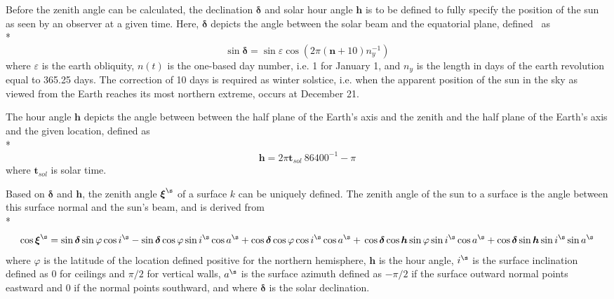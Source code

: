 Before the zenith angle can be calculated, the declination $\boldsymbol{\delta}$ and solar hour angle $\boldsymbol{h}$ is to be defined to fully specify the position of the sun as seen by an observer at a given time. Here, $\boldsymbol{\delta}$ depicts the angle between the solar beam and the equatorial plane, defined~\cite{Spencer1971} as \\*
\begin{equation}
\sin \boldsymbol{\delta} = \sin \varepsilon \cos \left(2\pi \left(\boldsymbol{n}+10\right) n_{y}^{-1} \right)
\end{equation}
where $\varepsilon$ is the earth obliquity, $n(t)$ is the one-based day number, i.e. 1 for January 1, and $n_{y}$ is the length in days of the earth revolution equal to 365.25 days. The correction of 10 days is required as winter solstice, i.e. when the apparent position of the sun in the sky as viewed from the Earth reaches its most northern extreme, occurs at December 21. 

The hour angle $\boldsymbol{h}$ depicts the angle between between the half plane of the Earth's axis and the zenith and the half plane of the Earth's axis and the given location, defined as  \\*
\begin{equation}
\boldsymbol{h} = 2\pi \boldsymbol{t}_{sol}\ 86400^{-1} - \pi
\end{equation}
where $\boldsymbol{t}_{sol}$ is solar time.

Based on $\boldsymbol{\delta}$ and $\boldsymbol{h}$, the zenith angle $\boldsymbol{\xi}^{\s}$ of a surface $k$ can be uniquely defined. The zenith angle of the sun to a surface is the angle between this surface normal and the sun's beam, and is derived from~\cite{Duffie1980,Iqbal1983} \\*
\begin{equation} 
\cos\boldsymbol{\xi}^{\s}=\sin\boldsymbol{\delta}  \sin\varphi  \cos i^{\s}-\sin\boldsymbol{\delta}  \cos\varphi  \sin i^{\s} \cos a^{\s}+\cos\boldsymbol{\delta} \cos\varphi  \cos i^{\s} \cos a^{\s} + \\ \cos\boldsymbol{\delta}  \cos \boldsymbol{h}  \sin\varphi  \sin i^{\s}  \cos a^{\s} +\cos\boldsymbol{\delta}  \sin \boldsymbol{h} \sin i^{\s} \sin a^{\s} 
\end{equation}
where $\varphi$ is the latitude of the location defined positive for the northern hemisphere, $\boldsymbol{h}$ is the hour angle, $i^{\s}$ is the surface inclination defined as 0 for ceilings and $\pi/2$ for vertical walls, $a^{\s}$ is the surface azimuth defined as $-\pi/2$ if the surface outward normal points eastward and 0 if the normal points southward, and where $\boldsymbol{\delta}$ is the solar declination.

